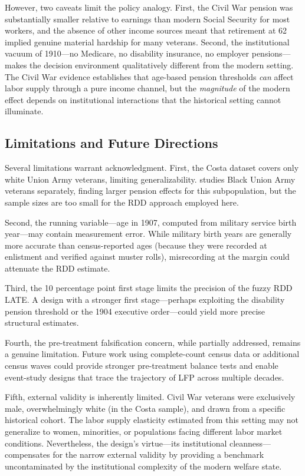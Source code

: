 \documentclass[12pt]{article}
\begin{document}
However, two caveats limit the policy analogy. First, the Civil War pension was substantially smaller relative to earnings than modern Social Security for most workers, and the absence of other income sources meant that retirement at 62 implied genuine material hardship for many veterans. Second, the institutional vacuum of 1910---no Medicare, no disability insurance, no employer pensions---makes the decision environment qualitatively different from the modern setting. The Civil War evidence establishes that age-based pension thresholds \textit{can} affect labor supply through a pure income channel, but the \textit{magnitude} of the modern effect depends on institutional interactions that the historical setting cannot illuminate.

\subsection{Limitations and Future Directions}

Several limitations warrant acknowledgment. First, the Costa dataset covers only white Union Army veterans, limiting generalizability. \citet{costa1998labor} studies Black Union Army veterans separately, finding larger pension effects for this subpopulation, but the sample sizes are too small for the RDD approach employed here.

Second, the running variable---age in 1907, computed from military service birth year---may contain measurement error. While military birth years are generally more accurate than census-reported ages (because they were recorded at enlistment and verified against muster rolls), misrecording at the margin could attenuate the RDD estimate.

Third, the 10 percentage point first stage limits the precision of the fuzzy RDD LATE. A design with a stronger first stage---perhaps exploiting the disability pension threshold or the 1904 executive order---could yield more precise structural estimates.

Fourth, the pre-treatment falsification concern, while partially addressed, remains a genuine limitation. Future work using complete-count census data or additional census waves could provide stronger pre-treatment balance tests and enable event-study designs that trace the trajectory of LFP across multiple decades.

Fifth, external validity is inherently limited. Civil War veterans were exclusively male, overwhelmingly white (in the Costa sample), and drawn from a specific historical cohort. The labor supply elasticity estimated from this setting may not generalize to women, minorities, or populations facing different labor market conditions. Nevertheless, the design's virtue---its institutional cleanness---compensates for the narrow external validity by providing a benchmark uncontaminated by the institutional complexity of the modern welfare state.
\end{document}
